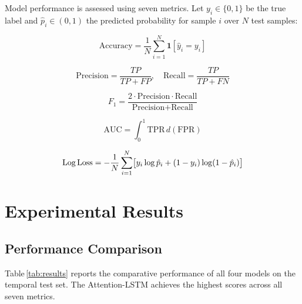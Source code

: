 \documentclass[conference]{IEEEtran}
\begin{document}
Model performance is assessed using seven metrics.  Let $y_i \in \{0,1\}$
be the true label and $\hat{p}_i \in (0,1)$ the predicted probability
for sample $i$ over $N$ test samples:

\begin{equation}
\text{Accuracy} = \frac{1}{N}\sum_{i=1}^{N}\mathbf{1}[\hat{y}_i = y_i]
\end{equation}

\begin{equation}
\text{Precision} = \frac{TP}{TP+FP}, \quad
\text{Recall} = \frac{TP}{TP+FN}
\end{equation}

\begin{equation}
F_1 = \frac{2\cdot\text{Precision}\cdot\text{Recall}}
          {\text{Precision}+\text{Recall}}
\end{equation}

\begin{equation}
\text{AUC} = \int_0^1 \text{TPR}\,d(\text{FPR})
\end{equation}

\begin{equation}
\text{Log\,Loss} = -\frac{1}{N}\sum_{i=1}^{N}
\bigl[y_i\log\hat{p}_i + (1-y_i)\log(1-\hat{p}_i)\bigr]
\end{equation}

\section{Experimental Results}

\subsection{Performance Comparison}

Table\,\ref{tab:results} reports the comparative performance of all four
models on the temporal test set.  The Attention-LSTM achieves the highest
scores across all seven metrics.
\end{document}
